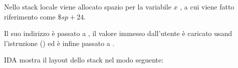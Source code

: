 
Nello stack locale viene allocato spazio per la variabile $x$ , a cui viene fatto riferimento come $\$sp+24$.

Il suo indirizzo è passato a \scanf, il valore immesso dall'utente è caricato usand l'istruzione  () ed è infine passato a \printf.



IDA mostra il layout dello stack nel modo seguente:



